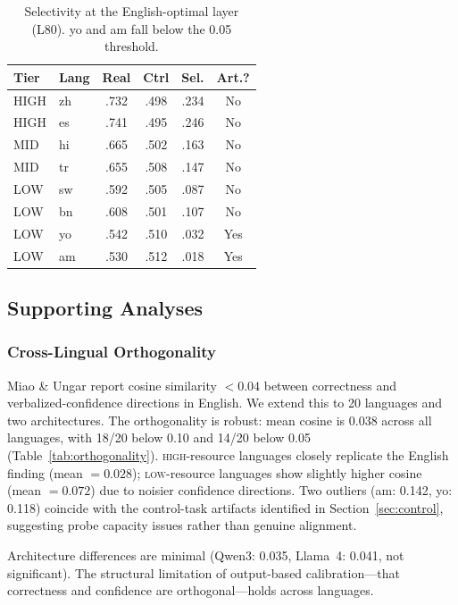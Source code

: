 \documentclass[11pt,a4paper]{article}
\begin{document}
\begin{table}[t]
\centering
\small
\begin{tabular}{llcccc}
\toprule
Tier & Lang & Real & Ctrl & Sel. & Art.? \\
\midrule
HIGH & zh & .732 & .498 & .234 & No \\
HIGH & es & .741 & .495 & .246 & No \\
MID  & hi & .665 & .502 & .163 & No \\
MID  & tr & .655 & .508 & .147 & No \\
LOW  & sw & .592 & .505 & .087 & No \\
LOW  & bn & .608 & .501 & .107 & No \\
LOW  & yo & .542 & .510 & .032 & Yes \\
LOW  & am & .530 & .512 & .018 & Yes \\
\bottomrule
\end{tabular}
\caption{Selectivity at the English-optimal layer (L80). yo and am fall below the 0.05 threshold.}
\label{tab:selectivity}
\end{table}


\subsection{Supporting Analyses}

\subsubsection{Cross-Lingual Orthogonality}
\label{sec:orthogonality}

Miao \& Ungar \citeyearpar{miao2026steering} report cosine similarity $<0.04$ between correctness and verbalized-confidence directions in English. We extend this to 20 languages and two architectures. The orthogonality is robust: mean cosine is 0.038 across all languages, with 18/20 below 0.10 and 14/20 below 0.05 (Table~\ref{tab:orthogonality}). \textsc{high}-resource languages closely replicate the English finding (mean $=0.028$); \textsc{low}-resource languages show slightly higher cosine (mean $=0.072$) due to noisier confidence directions. Two outliers (am: 0.142, yo: 0.118) coincide with the control-task artifacts identified in Section~\ref{sec:control}, suggesting probe capacity issues rather than genuine alignment.

Architecture differences are minimal (Qwen3: 0.035, Llama~4: 0.041, not significant). The structural limitation of output-based calibration---that correctness and confidence are orthogonal---holds across languages.
\end{document}
